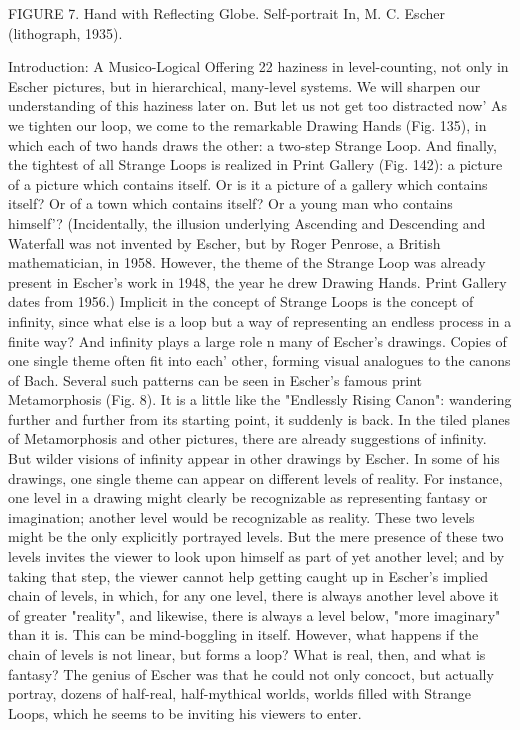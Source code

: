 FIGURE 7. Hand with Reflecting Globe. Self-portrait In, M. C. Escher (lithograph, 1935). 







Introduction: A Musico-Logical Offering   22 haziness in level-counting, not only in Escher pictures, but in hierarchical, many-level systems. We will sharpen our understanding of this haziness later on. But let us not get too distracted now' As we tighten our loop, we come to the remarkable Drawing Hands (Fig. 135), in which each of two hands draws the other: a two-step Strange Loop. And finally, the tightest of all Strange Loops is realized in Print Gallery (Fig. 142): a picture of a picture which contains itself. Or is it a picture of a gallery which contains itself? Or of a town which contains itself? Or a young man who contains himself'? (Incidentally, the illusion underlying Ascending and Descending and Waterfall was not invented by Escher, but by Roger Penrose, a British mathematician, in 1958. However, the theme of the Strange Loop was already present in Escher's work in 1948, the year he drew Drawing Hands. Print Gallery dates from 1956.) Implicit in the concept of Strange Loops is the concept of infinity, since what else is a loop but a way of representing an endless process in a finite way? And infinity plays a large role n many of Escher's drawings. Copies of one single theme often fit into each' other, forming visual analogues to the canons of Bach. Several such patterns can be seen in Escher's famous print Metamorphosis (Fig. 8). It is a little like the "Endlessly Rising Canon": wandering further and further from its starting point, it suddenly is back. In the tiled planes of Metamorphosis and other pictures, there are already suggestions of infinity. But wilder visions of infinity appear in other drawings by Escher. In some of his drawings, one single theme can appear on different levels of reality. For instance, one level in a drawing might clearly be recognizable as representing fantasy or imagination; another level would be recognizable as reality. These two levels might be the only explicitly portrayed levels. But the mere presence of these two levels invites the viewer to look upon himself as part of yet another level; and by taking that step, the viewer cannot help getting caught up in Escher's implied chain of levels, in which, for any one level, there is always another level above it of greater "reality", and likewise, there is always a level below, "more imaginary" than it is. This can be mind-boggling in itself. However, what happens if the chain of levels is not linear, but forms a loop? What is real, then, and what is fantasy? The genius of Escher was that he could not only concoct, but actually portray, dozens of half-real, half-mythical worlds, worlds filled with Strange Loops, which he seems to be inviting his viewers to enter. 

